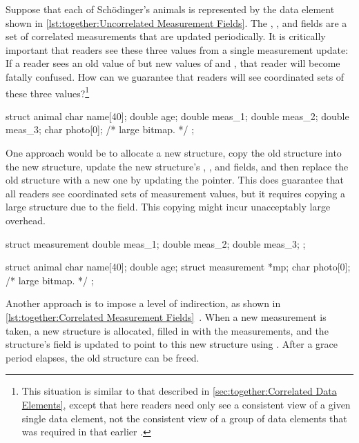 Suppose that each of Sch\"odinger's animals is represented by the
data element shown in
\cref{lst:together:Uncorrelated Measurement Fields}.
The , , and  fields are a set
of correlated measurements that are updated periodically.
It is critically important that readers see these three values from
a single measurement update:
If a reader sees an old value of  but new values of
 and , that reader will become fatally confused.
How can we guarantee that readers will see coordinated sets of these
three values?\footnote{
	This situation is similar to that described in
	\cref{sec:together:Correlated Data Elements},
	except that here readers need only see a consistent view of a
	given single data element, not the consistent view of a
	group of data elements that was required in that earlier
	.}

\begin{listing}
\begin{VerbatimL}[tabsize=8]
struct animal {
	char name[40];
	double age;
	double meas_1;
	double meas_2;
	double meas_3;
	char photo[0]; /* large bitmap. */
};
\end{VerbatimL}
\caption{Uncorrelated Measurement Fields}
\label{lst:together:Uncorrelated Measurement Fields}
\end{listing}

One approach would be to allocate a new  structure,
copy the old structure into the new structure, update the new
structure's , , and  fields,
and then replace the old structure with a new one by updating
the pointer.
This does guarantee that all readers see coordinated sets of
measurement values, but it requires copying a large structure due
to the  field.
This copying might incur unacceptably large overhead.

\begin{listing}
\begin{VerbatimL}[tabsize=8]
struct measurement {
	double meas_1;
	double meas_2;
	double meas_3;
};

struct animal {
	char name[40];
	double age;
	struct measurement *mp;
	char photo[0]; /* large bitmap. */
};
\end{VerbatimL}
\caption{Correlated Measurement Fields}
\label{lst:together:Correlated Measurement Fields}
\end{listing}

Another approach is to impose a level of indirection, as shown in
\cref{lst:together:Correlated Measurement Fields}~\cite[Section 5.3.4]{PaulEdwardMcKenneyPhD}.
When a new measurement is taken, a new  structure
is allocated, filled in with the measurements, and the 
structure's  field is updated to point to this new
 structure using .
After a grace period elapses, the old  structure
can be freed.

